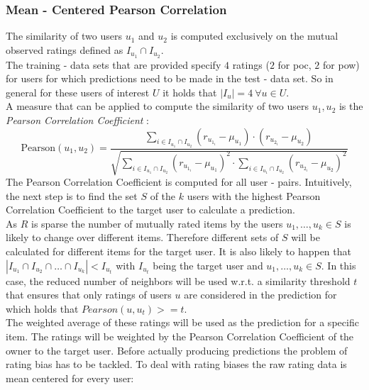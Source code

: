 \subsubsection{Mean - Centered Pearson Correlation}
The similarity of two users $u_1$ and $u_2$ is computed exclusively on the mutual observed ratings defined as $I_u_1 \cap I_u_2$.\\
The training - data sets that are provided specify $4$ ratings ($2$ for \acrshort{poc}, $2$ for \acrshort{pow}) for users for which predictions need to be made in the test - data set. So in general for these users of interest $U$ it holds that $|I_u| = 4\: \forall{u \in U}$.\\
A measure that can be applied to compute the similarity of two users $u_1, u_2$ is the \textit{Pearson Correlation Coefficient} \cite{benesty2009pearson}:
\begin{equation}
    \text{Pearson}(u_1, u_2) = \frac{\sum\limits_{i \in I_u_1 \cap I_u_2} (r_{u_1_i} - \mu_u_1) \cdot (r_{u_2_i} - \mu_u_2)}{\sqrt{\sum\limits_{i \in I_u_1 \cap I_u_2} (r_{u_1_i} - \mu_u_1)^2 \cdot \sum\limits_{i \in I_u_1 \cap I_u_2} (r_{u_2_i} - \mu_u_2)^2}}
\end{equation}
The Pearson Correlation Coefficient is computed for all user - pairs. Intuitively, the next step is to find the set $S$ of the $k$ users with the highest Pearson Correlation Coefficient to the target user to calculate a prediction.\\
As $R$ is sparse the number of mutually rated items by the users $u_1,\dots,u_k \in S$ is likely to change over different items. Therefore different sets of $S$ will be calculated for different items for the target user. It is also likely to happen that $|I_{u_1} \cap I_{u_2} \cap \dots \cap I_{u_k}| < I_{u_t}$ with $I_{u_t}$ being the target user and $u_1,\dots,u_k \in S$. In this case, the reduced number of neighbors will be used w.r.t. a similarity threshold $t$ that ensures that only ratings of users $u$ are considered in the prediction for which holds that $Pearson(u, u_t) >= t$.\\
The weighted average of these ratings will be used as the prediction for a specific item. The ratings will be weighted by the Pearson Correlation Coefficient of the owner to the target user.
Before actually producing predictions the problem of rating bias has to be tackled. To deal with rating biases the raw rating data is mean centered for every user:

